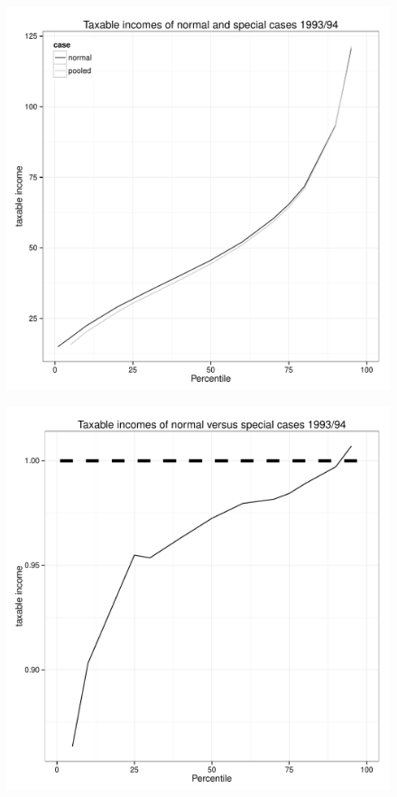 \documentclass[twoside]{article}\usepackage[]{graphicx}\usepackage[]{color}
\makeatletter
\def\maxwidth{ %
  \ifdim\Gin@nat@width>\linewidth
    \linewidth
  \else
    \Gin@nat@width
  \fi
}
\newenvironment{knitrout}{}{} %
\makeatother
\begin{document}
\begin{multicols}{2}
\begin{knitrout}
\begin{figure}[]
\includegraphics[width=\maxwidth]{figure/specialcases93941} \caption[]{\label{fig:specialcases93941}}
\end{figure}

\begin{figure}[]

\includegraphics[width=\maxwidth]{figure/specialcases93942} \caption[]{\label{fig:specialcases93942}}
\end{figure}



\end{knitrout}
\end{multicols}
\end{document}
